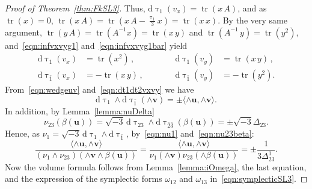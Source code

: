 \documentclass[11pt]{article}
\theoremstyle{definition}
\numberwithin{equation}{section}
\numberwithin{figure}{section}
\numberwithin{table}{section}
\DeclareMathOperator{\tr}{tr}
\newcommand{\ubf}{\mathbf{u}}
\newcommand{\vbf}{\mathbf{v}}
\newcommand*{\dd}{\mathrm{d}}
\begin{document}
\begin{proof}[Proof of Theorem~\ref{thm:FkSL3}]
Thus, $\dd \uptau_1(v_x)=\tr(x\, A)$, and as $\tr(x)=0$, $\tr(x\, A)=\tr(x\, A- \frac{\uptau_1}{3}x)=\tr(x\, x)$. By the very same argument, $\tr(y\, A)=\tr(A^{-1}x)=\tr(x\, y)$ and $\tr(A^{-1}\, y)=\tr(y^2)$, and~\eqref{eqn:infvxvyg1} and~\eqref{eqn:infvxvyg1bar} yield
\begin{equation}\label{eqn:dt1dt2vxvy}
\begin{aligned}
\dd \uptau_1(v_x)&=\tr(x^2)\,, \qquad\qquad & \dd \uptau_1(v_y)&=\tr(x\, y)\,, \\
\dd \uptau_{\bar 1}(v_x)&=-\tr(x\, y)\,, & \dd \uptau_{\bar 1}(v_y)&=-\tr(y^2).
\end{aligned}
\end{equation}
From~\eqref{eqn:wedgeuv} and~\eqref{eqn:dt1dt2vxvy} we have
\begin{equation}\label{eqn:nu1}
\dd \uptau_1\wedge \dd \uptau_{\bar 1} (\wedge \vbf)= \pm \langle \wedge\ubf, \wedge\vbf \rangle.
\end{equation}
In addition, by Lemma~\ref{lemma:nuDelta}
\begin{equation}\label{eqn:nu23beta}
\nu_{23} (\beta(\ubf))= \sqrt{-3}\, \dd \uptau_{23}\wedge \dd \uptau_{\bar 2\bar 3} (\beta(\ubf)) = \pm\sqrt{-3} \varDelta_{23}.
\end{equation}
Hence, as $\nu_1=\sqrt{-3 } \, \dd \uptau_{1}\wedge \dd \uptau_{\bar 1}$, by~\eqref{eqn:nu1} and~\eqref{eqn:nu23beta}:
\[
\frac{ \langle \wedge\ubf, \wedge\vbf \rangle }{ (\nu_1 \wedge \nu_{23}) (\wedge\vbf\wedge\beta(\ubf)) } =
\frac{ \langle \wedge\ubf, \wedge\vbf \rangle }{\nu_1(\wedge\vbf)\nu_{23}(\wedge\beta(\ubf)) } =\pm\frac{1}{ 3\varDelta^1_{23}}.
\]
Now the volume formula follows from Lemma~\ref{lemma:iOmega}, the last equation, and the expression of the symplectic forms $\omega_{12}$ and $\omega_{13}$ in~\eqref{eqn:symplecticSL3}.
\end{proof}
\end{document}

